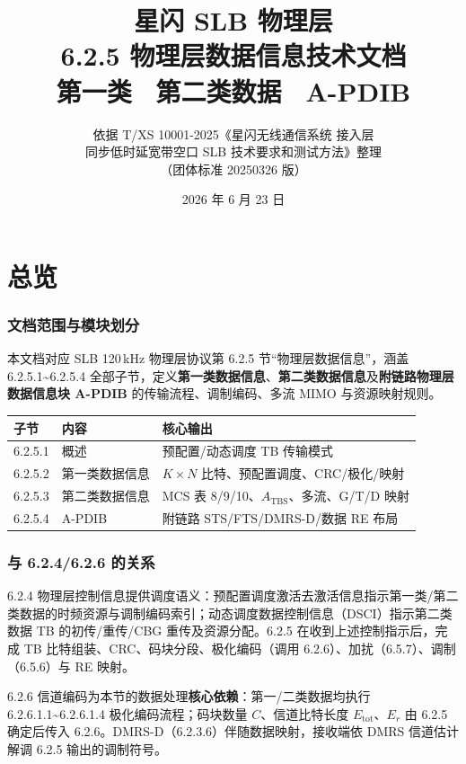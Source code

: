 \documentclass[11pt,a4paper]{ctexart}
\title{%
  \textbf{星闪 SLB 物理层}\\[0.4em]
  \Large 6.2.5 物理层数据信息技术文档\\[0.3em]
  \large 第一类 \textbullet\ 第二类数据 \textbullet\ A-PDIB
}
\author{依据 T/XS 10001-2025《星闪无线通信系统 接入层\\
同步低时延宽带空口 SLB 技术要求和测试方法》整理\\
（团体标准 20250326 版）}
\date{2026 年 6 月 23 日}
\begin{document}
\maketitle
\tableofcontents
\newpage

\part{总览}

\section{文档范围与模块划分}

本文档对应 SLB 120\,kHz 物理层协议第 6.2.5 节``物理层数据信息''，涵盖 6.2.5.1\textasciitilde 6.2.5.4 全部子节，定义\textbf{第一类数据信息}、\textbf{第二类数据信息}及\textbf{附链路物理层数据信息块 A-PDIB} 的传输流程、调制编码、多流 MIMO 与资源映射规则。

\begin{table}[h]
\centering
\small
\begin{tabular}{lll}
\toprule
\textbf{子节} & \textbf{内容} & \textbf{核心输出} \\
\midrule
6.2.5.1 & 概述 & 预配置/动态调度 TB 传输模式 \\
6.2.5.2 & 第一类数据信息 & $K{\times}N$ 比特、预配置调度、CRC/极化/映射 \\
6.2.5.3 & 第二类数据信息 & MCS 表 8/9/10、$A_{\mathrm{TBS}}$、多流、G/T/D 映射 \\
6.2.5.4 & A-PDIB & 附链路 STS/FTS/DMRS-D/数据 RE 布局 \\
\bottomrule
\end{tabular}
\end{table}

\section{与 6.2.4/6.2.6 的关系}

6.2.4 物理层控制信息提供调度语义：预配置调度激活去激活信息指示第一类/第二类数据的时频资源与调制编码索引；动态调度数据控制信息（DSCI）指示第二类数据 TB 的初传/重传/CBG 重传及资源分配。6.2.5 在收到上述控制指示后，完成 TB 比特组装、CRC、码块分段、极化编码（调用 6.2.6）、加扰（6.5.7）、调制（6.5.6）与 RE 映射。

6.2.6 信道编码为本节的数据处理\textbf{核心依赖}：第一/二类数据均执行 6.2.6.1.1\textasciitilde 6.2.6.1.4 极化编码流程；码块数量 $C$、信道比特长度 $E_{\mathrm{tot}}$、$E_r$ 由 6.2.5 确定后传入 6.2.6。DMRS-D（6.2.3.6）伴随数据映射，接收端依 DMRS 信道估计解调 6.2.5 输出的调制符号。
\end{document}
